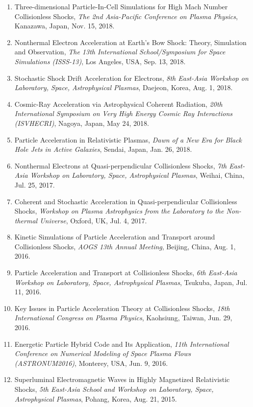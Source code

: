 \documentclass[lualatex,a4paper,ja=standard]{scrartcl}
\newcommand{\TalkEntry}[3]{
\item #1, \textit{#2}, #3.}
\begin{document}
\begin{enumerate}
	\TalkEntry
	{Three-dimensional Particle-In-Cell Simulations for High Mach Number Collisionless Shocks}
	{The 2nd Asia-Pacific Conference on Plasma Physics}
	{Kanazawa, Japan, Nov. 15, 2018}

	\TalkEntry
	{Nonthermal Electron Acceleration at Earth's Bow Shock: Theory, Simulation and Observation}
	{The 13th International School/Symposium for Space Simulations (ISSS-13)}
	{Los Angeles, USA, Sep. 13, 2018}

	\TalkEntry
	{Stochastic Shock Drift Acceleration for Electrons}
	{8th East-Asia Workshop on Laboratory, Space, Astrophysical Plasmas}
	{Daejeon, Korea, Aug. 1, 2018}

	\TalkEntry
	{Cosmic-Ray Acceleration via Astrophysical Coherent Radiation}
	{20th International Symposium on Very High Energy Cosmic Ray Interactions (ISVHECRI)}
	{Nagoya, Japan, May 24, 2018}

	\TalkEntry
	{Particle Acceleration in Relativistic Plasmas}
	{Dawn of a New Era for Black Hole Jets in Active Galaxies}
	{Sendai, Japan, Jan. 26, 2018}

	\TalkEntry
	{Nonthermal Electrons at Quasi-perpendicular Collisionless Shocks}
	{7th East-Asia Workshop on Laboratory, Space, Astrophysical Plasmas}
	{Weihai, China, Jul. 25, 2017}

	\TalkEntry
	{Coherent and Stochastic Acceleration in Quasi-perpendicular Collisionless Shocks}
	{Workshop on Plasma Astrophysics from the Laboratory to the Non-thermal Universe}
	{Oxford, UK, Jul. 4, 2017}

	\TalkEntry
	{Kinetic Simulations of Particle Acceleration and Transport around Collisionless Shocks}
	{AOGS 13th Annual Meeting}
	{Beijing, China, Aug. 1, 2016}

	\TalkEntry
	{Particle Acceleration and Transport at Collisionless Shocks}
	{6th East-Asia Workshop on Laboratory, Space, Astrophysical Plasmas}
	{Tsukuba, Japan, Jul. 11, 2016}

	\TalkEntry
	{Key Issues in Particle Acceleration Theory at Collisionless Shocks}
	{18th International Congress on Plasma Physics}
	{Kaohsiung, Taiwan, Jun. 29, 2016}

	\TalkEntry
	{Energetic Particle Hybrid Code and Its Application}
	{11th International Conference on Numerical Modeling of Space Plasma Flows (ASTRONUM2016)}
	{Monterey, USA, Jun. 9, 2016}

	\TalkEntry
	{Superluminal Electromagnetic Waves in Highly Magnetized Relativistic Shocks}
	{5th East-Asia School and Workshop on Laboratory, Space, Astrophysical Plasmas}
	{Pohang, Korea, Aug. 21, 2015}


\end{enumerate}
\end{document}
